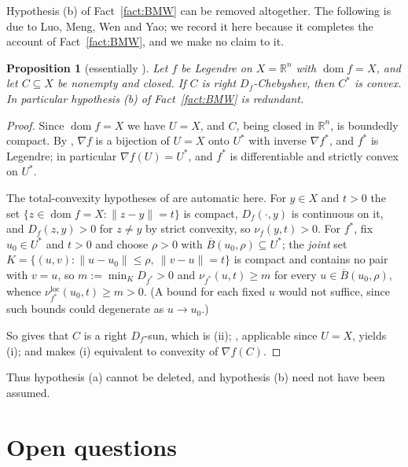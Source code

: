 \documentclass[11pt]{amsart}
\theoremstyle{plain}
\newtheorem{proposition}[theorem]{Proposition}
\theoremstyle{definition}
\theoremstyle{remark}
\newcommand{\R}{\mathbb{R}}
\newcommand{\dom}{\operatorname{dom}}
\newcommand{\D}{D_f}
\newcommand{\Cstar}{C^{*}}
\begin{document}
Hypothesis (b) of Fact~\ref{fact:BMW} can be removed altogether. The following
is due to Luo, Meng, Wen and Yao; we record it here because it completes the
account of Fact~\ref{fact:BMW}, and we make no claim to it.

\begin{proposition}[essentially {\cite[Theorems 3.12 and 3.13]{LMWY2019}}]
\label{prop:b}
Let $f$ be Legendre on $X = \R^{n}$ with $\dom f = X$, and let $C \subseteq X$
be nonempty and closed. If $C$ is right $\D$-Chebyshev, then $\Cstar$ is convex.
In particular hypothesis \textup{(b)} of Fact~\textup{\ref{fact:BMW}} is
redundant.
\end{proposition}

\begin{proof}
Since $\dom f = X$ we have $U = X$, and $C$, being closed in $\R^{n}$, is
boundedly compact. By \cite[Theorem 26.5]{Rock1970}, $\nabla f$ is a bijection
of $U = X$ onto $U^{*}$ with inverse $\nabla f^{*}$, and $f^{*}$ is Legendre; in
particular $\nabla f(U) = U^{*}$, and $f^{*}$ is differentiable and strictly
convex on $U^{*}$.

The total-convexity hypotheses of \cite[Theorem 3.13]{LMWY2019} are automatic
here. For $y \in X$ and $t > 0$ the set $\{z \in \dom f = X :
\lVert z - y \rVert = t\}$ is compact, $\D(\cdot, y)$ is continuous on it, and
$\D(z,y) > 0$ for $z \neq y$ by strict convexity, so
$\nu_{f}(y,t) > 0$. For $f^{*}$, fix $u_{0} \in U^{*}$ and $t > 0$ and choose
$\rho > 0$ with $\overline{B}(u_{0},\rho) \subseteq U^{*}$; the \emph{joint}
set $K = \{(u,v) : \lVert u - u_{0}\rVert \le \rho,\ \lVert v - u \rVert = t\}$
is compact and contains no pair with $v = u$, so $m := \min_{K} D_{f^{*}} > 0$
and $\nu_{f^{*}}(u,t) \ge m$ for every $u \in \overline{B}(u_{0},\rho)$, whence
$\nu^{\mathrm{loc}}_{f^{*}}(u_{0},t) \ge m > 0$. (A bound for each fixed $u$
would not suffice, since such bounds could degenerate as $u \to u_{0}$.)

So \cite[Theorem 3.13]{LMWY2019} gives that $C$ is a right $\D$-sun, which is
(ii); \cite[Theorem 3.12(2)]{LMWY2019}, applicable since $U = X$, yields (i);
and \cite[Theorem 3.12(3)]{LMWY2019} makes (i) equivalent to convexity of
$\nabla f(C)$.
\end{proof}

Thus hypothesis (a) cannot be deleted, and hypothesis (b) need not have been
assumed.

\section{Open questions}\label{sec:open}
\end{document}
